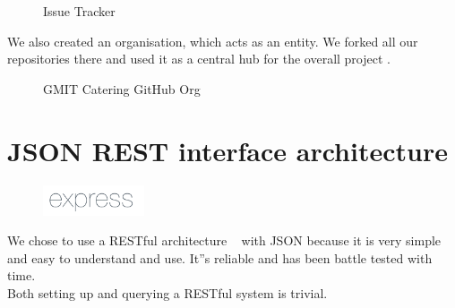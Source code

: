  \begin{figure}[H] 
  	\caption{Issue Tracker}
  \end{figure}
  
  
  We also created an organisation, which acts as an entity.
  We forked all our repositories there and used it as a central hub for the overall project \cite{github_org}.
  \begin{figure}[H] 
  	\caption{GMIT Catering GitHub Org}
  	\label{fig:speciation}
  \end{figure}
  
  \section{JSON REST interface architecture}	%
  \begin{figure}
  	\includegraphics[width=3cm]{img/mobile-app/logos/express.png}
  \end{figure} 
We chose to use a RESTful architecture   ~\cite{JSON_REST_interface} with JSON   \cite{json} because it is very simple and easy to understand and use.
It''s reliable and has been battle tested with time.
\\
Both setting up and querying a RESTful system is trivial.

